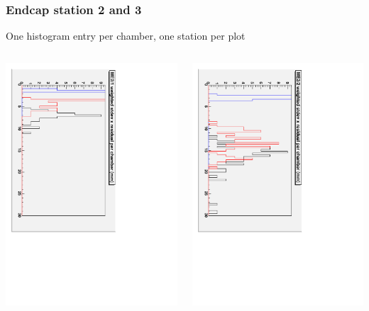 \documentclass[compress]{beamer}
\begin{document}
\begin{frame}
\frametitle{Endcap station 2 and 3}
One histogram entry per chamber, one station per plot

\begin{columns}
\includegraphics[height=\linewidth, angle=90]{stdevs_me21.pdf}

\includegraphics[height=\linewidth, angle=90]{stdevs_me22.pdf}


\end{columns}
\end{frame}
\end{document}
